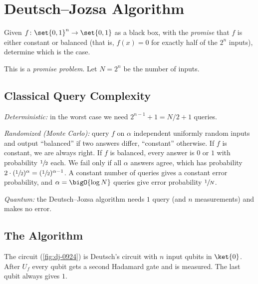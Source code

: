 \section{Deutsch--Jozsa Algorithm}

\begin{problem}
    Given $f \colon \set{0,1}^n \to \set{0,1}$ as a black box, with the \emph{promise} that $f$ is
    either constant or balanced (that is, $f(x) = 0$ for exactly half of the $2^n$ inputs), determine
    which is the case.
\end{problem}

This is a \emph{promise problem}. Let $N = 2^n$ be the number of inputs.

\subsection{Classical Query Complexity}

\emph{Deterministic:} in the worst case we need $2^{n-1} + 1 = N/2 + 1$ queries.

\emph{Randomized (Monte Carlo):} query $f$ on $\alpha$ independent uniformly random inputs and output
``balanced'' if two answers differ, ``constant'' otherwise. If $f$ is constant, we are always right. If
$f$ is balanced, every answer is $0$ or $1$ with probability $\sfrac{1}{2}$ each. We fail only if
all $\alpha$ answers agree, which has probability
$2 \cdot (\sfrac{1}{2})^{\alpha} = (\sfrac{1}{2})^{\alpha - 1}$. A constant number of queries gives a
constant error probability, and $\alpha = \bigO{\log N}$ queries give error probability $\sfrac{1}{N}$.

\emph{Quantum:} the Deutsch--Jozsa algorithm needs $1$ query (and $n$ measurements) and makes no error.

\subsection{The Algorithm}

The circuit (\cref{fig:dj-0924}) is Deutsch's circuit with $n$ input qubits in $\ket{0}$.
After $U_f$ every qubit gets a second Hadamard gate and is measured. The last qubit always gives $1$.

